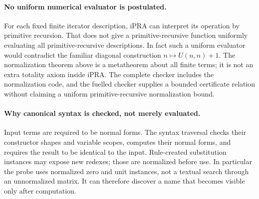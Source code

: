 \paragraph{No uniform numerical evaluator is postulated.}
For each fixed finite iterator description, iPRA can interpret its
operation by primitive recursion. That does not give a primitive-recursive
function uniformly evaluating all primitive-recursive descriptions. In
fact such a uniform evaluator would contradict the familiar diagonal
construction $n\mapsto U(n,n)+1$. The normalization theorem above is a
metatheorem about all finite terms; it is not an extra totality axiom
inside iPRA. The complete checker includes the normalization code, and
the fuelled checker supplies a bounded certificate relation without
claiming a uniform primitive-recursive normalization bound.

\paragraph{Why canonical syntax is checked, not merely evaluated.}
Input terms are required to be normal forms. The syntax traversal checks
their constructor shapes and variable scopes, computes their normal
forms, and requires the result to be identical to the input. Rule-created
substitution instances may expose new redexes; those are normalized
before use. In particular the probe uses normalized zero and unit
instances, not a textual search through an unnormalized matrix. It can
therefore discover a name that becomes visible only after computation.
